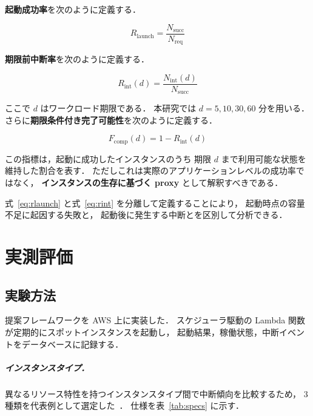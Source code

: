 \documentclass[11pt,a4paper]{ltjsreport}
\newcommand{\Fcomp}{F_{\mathrm{comp}}}
\newcommand{\Rlaunch}{R_{\mathrm{launch}}}
\newcommand{\Rint}{R_{\mathrm{int}}}
\newcommand{\Nreq}{N_{\mathrm{req}}}
\newcommand{\Nsucc}{N_{\mathrm{succ}}}
\newcommand{\Nint}{N_{\mathrm{int}}}
\begin{document}
\textbf{起動成功率}を次のように定義する．

\begin{equation}
\Rlaunch = \frac{\Nsucc}{\Nreq}
\label{eq:rlaunch}
\end{equation}

\textbf{期限前中断率}を次のように定義する．

\begin{equation}
\Rint(d) = \frac{\Nint(d)}{\Nsucc}
\label{eq:rint}
\end{equation}

ここで $d$ はワークロード期限である．
本研究では $d = 5, 10, 30, 60$ 分を用いる．
さらに\textbf{期限条件付き完了可能性}を次のように定義する．

\begin{equation}
\boxed{\;\Fcomp(d) = 1 - \Rint(d)\;}
\label{eq:fcomp}
\end{equation}

この指標は，起動に成功したインスタンスのうち
期限 $d$ まで利用可能な状態を維持した割合を表す．
ただしこれは実際のアプリケーションレベルの成功率ではなく，
\textbf{インスタンスの生存に基づく proxy} として解釈すべきである．

式~\eqref{eq:rlaunch} と式~\eqref{eq:rint} を分離して定義することにより，
起動時点の容量不足に起因する失敗と，
起動後に発生する中断とを区別して分析できる．

\chapter{実測評価}
\label{chap:eval}

\section{実験方法}

提案フレームワークを AWS 上に実装した．
スケジューラ駆動の Lambda 関数が定期的にスポットインスタンスを起動し，
起動結果，稼働状態，中断イベントをデータベースに記録する．

\paragraph{インスタンスタイプ．}
異なるリソース特性を持つインスタンスタイプ間で中断傾向を比較するため，
3 種類を代表例として選定した~\cite{Pham2018,AWSInstanceTypes}．
仕様を表~\ref{tab:specs} に示す．
\end{document}
